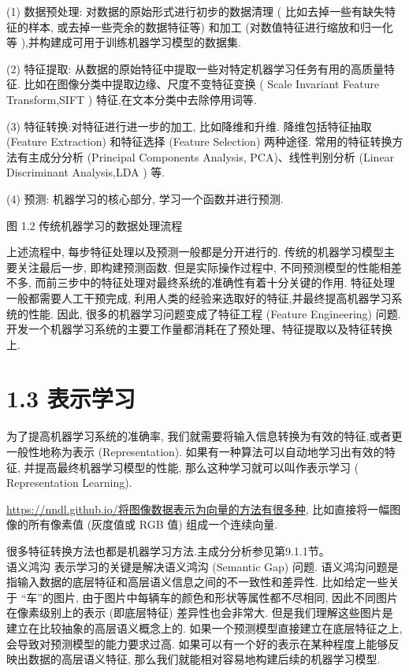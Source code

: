 \documentclass[10pt]{article}
\begin{document}
(1) 数据预处理: 对数据的原始形式进行初步的数据清理 ( 比如去掉一些有缺失特征的样本, 或去掉一些壳余的数据特征等) 和加工 (对数值特征进行缩放和归一化等 ),并构建成可用于训练机器学习模型的数据集.

(2) 特征提取: 从数据的原始特征中提取一些对特定机器学习任务有用的高质量特征. 比如在图像分类中提取边缘、尺度不变特征变换 ( Scale Invariant Feature Transform,SIFT ) 特征,在文本分类中去除停用词等.

(3) 特征转换:对特征进行进一步的加工, 比如降维和升维. 降维包括特征抽取 (Feature Extraction) 和特征选择 (Feature Selection) 两种途径. 常用的特征转换方法有主成分分析 (Principal Components Analysis, PCA)、线性判别分析 (Linear Discriminant Analysis,LDA ) 等.

(4) 预测: 机器学习的核心部分, 学习一个函数并进行预测.



图 1.2 传统机器学习的数据处理流程

上述流程中, 每步特征处理以及预测一般都是分开进行的. 传统的机器学习模型主要关注最后一步, 即构建预测函数. 但是实际操作过程中, 不同预测模型的性能相差不多, 而前三步中的特征处理对最终系统的准确性有着十分关键的作用. 特征处理一般都需要人工干预完成, 利用人类的经验来选取好的特征,并最终提高机器学习系统的性能. 因此, 很多的机器学习问题变成了特征工程 (Feature Engineering) 问题. 开发一个机器学习系统的主要工作量都消耗在了预处理、特征提取以及特征转换上.

\section*{1.3 表示学习}
为了提高机器学习系统的准确率, 我们就需要将输入信息转换为有效的特征,或者更一般性地称为表示 (Representation). 如果有一种算法可以自动地学习出有效的特征, 并提高最终机器学习模型的性能, 那么这种学习就可以叫作表示学习 ( Representation Learning).

\href{https://nndl.github.io/%E5%B0%86%E5%9B%BE%E5%83%8F%E6%95%B0%E6%8D%AE%E8%A1%A8%E7%A4%BA%E4%B8%BA%E5%90%91%E9%87%8F%E7%9A%84%E6%96%B9%E6%B3%95%E6%9C%89%E5%BE%88%E5%A4%9A%E7%A7%8D}{https://nndl.github.io/将图像数据表示为向量的方法有很多种}, 比如直接将一幅图像的所有像素值 (灰度值或 RGB 值) 组成一个连续向量.

很多特征转换方法也都是机器学习方法.主成分分析参见第9.1.1节。\\
语义鸿沟 表示学习的关键是解决语义鸿沟 (Semantic Gap) 问题. 语义鸿沟问题是指输入数据的底层特征和高层语义信息之间的不一致性和差异性. 比如给定一些关于 “车”的图片, 由于图片中每辆车的颜色和形状等属性都不尽相同, 因此不同图片在像素级别上的表示 (即底层特征) 差异性也会非常大. 但是我们理解这些图片是建立在比较抽象的高层语义概念上的. 如果一个预测模型直接建立在底层特征之上, 会导致对预测模型的能力要求过高. 如果可以有一个好的表示在某种程度上能够反映出数据的高层语义特征, 那么我们就能相对容易地构建后续的机器学习模型.
\end{document}
